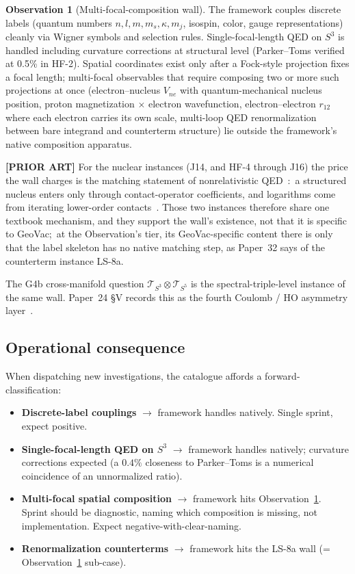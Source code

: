\documentclass[11pt,a4paper]{article}
\theoremstyle{plain}
\theoremstyle{definition}
\newtheorem{observation}[theorem]{Observation}
\newcommand{\Tcal}{\mathcal{T}}
\newcommand{\sphere}[1]{S^{#1}}
\begin{document}
\begin{observation}[Multi-focal-composition wall]
\label{obs:multi_focal_wall}
The framework couples discrete labels (quantum numbers $n, l, m, m_s, \kappa, m_j$, isospin, color, gauge representations) cleanly via Wigner symbols and selection rules. Single-focal-length QED on $\sphere{3}$ is handled including curvature corrections at structural level (Parker--Toms verified at 0.5\% in HF-2). Spatial coordinates exist only after a Fock-style projection fixes a focal length; multi-focal observables that require composing two or more such projections at once (electron--nucleus $V_{ne}$ with quantum-mechanical nucleus position, proton magnetization $\times$ electron wavefunction, electron--electron $r_{12}$ where each electron carries its own scale, multi-loop QED renormalization between bare integrand and counterterm structure) lie outside the framework's native composition apparatus.
\end{observation}

\textbf{[PRIOR ART]} For the nuclear instances (J14, and HF-4 through J16) the price the wall charges is the matching statement of nonrelativistic QED~\cite{hill_paz2011}:\ a structured nucleus enters only through contact-operator coefficients, and logarithms come from iterating lower-order contacts~\cite{karshenboim1997}. Those two instances therefore share one textbook mechanism, and they support the wall's existence, not that it is specific to GeoVac;\ at the Observation's tier, its GeoVac-specific content there is only that the label skeleton has no native matching step, as Paper~32 says of the counterterm instance LS-8a.

The G4b cross-manifold question $\Tcal_{\sphere{3}} \otimes \Tcal_{\sphere{5}}$ is the spectral-triple-level instance of the same wall. Paper~24 \S V records this as the fourth Coulomb / HO asymmetry layer~\cite{paper24}.

\subsection{Operational consequence}
\label{sec:unity_operational}

When dispatching new investigations, the catalogue affords a forward-classification:
\begin{itemize}
  \item \textbf{Discrete-label couplings} $\to$ framework handles natively. Single sprint, expect positive.
  \item \textbf{Single-focal-length QED on $\sphere{3}$} $\to$ framework handles natively; curvature corrections expected (a $0.4\%$ closeness to Parker--Toms is a numerical coincidence of an unnormalized ratio).
  \item \textbf{Multi-focal spatial composition} $\to$ framework hits Observation~\ref{obs:multi_focal_wall}. Sprint should be diagnostic, naming which composition is missing, not implementation. Expect negative-with-clear-naming.
  \item \textbf{Renormalization counterterms} $\to$ framework hits the LS-8a wall (= Observation~\ref{obs:multi_focal_wall} sub-case).
\end{itemize}
\end{document}
